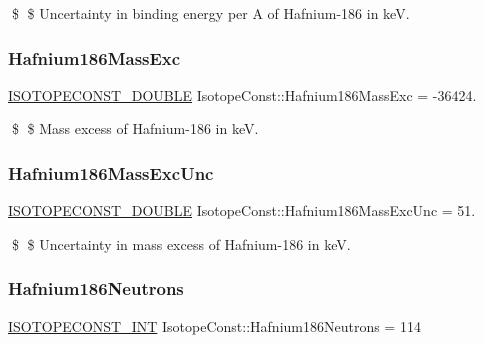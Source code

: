 \$ \$ Uncertainty in binding energy per A of Hafnium-\/186 in keV. \mbox{\label{group___isotope_const-_hafnium-_hf186_ga4c99e82df86530412f126ce981fc8a4b}} 
\subsubsection{\texorpdfstring{Hafnium186\+Mass\+Exc}{Hafnium186MassExc}}
{\footnotesize\ttfamily \mbox{\hyperlink{group___isotope_const-_macros_ga8f45a7272ce02c0b4c65c44636ed719a}{I\+S\+O\+T\+O\+P\+E\+C\+O\+N\+S\+T\+\_\+\+D\+O\+U\+B\+LE}} Isotope\+Const\+::\+Hafnium186\+Mass\+Exc = -\/36424.}

\$ \$ Mass excess of Hafnium-\/186 in keV. \mbox{\label{group___isotope_const-_hafnium-_hf186_gac3b5f85fcc136638dfdcbd44229a33a6}} 
\subsubsection{\texorpdfstring{Hafnium186\+Mass\+Exc\+Unc}{Hafnium186MassExcUnc}}
{\footnotesize\ttfamily \mbox{\hyperlink{group___isotope_const-_macros_ga8f45a7272ce02c0b4c65c44636ed719a}{I\+S\+O\+T\+O\+P\+E\+C\+O\+N\+S\+T\+\_\+\+D\+O\+U\+B\+LE}} Isotope\+Const\+::\+Hafnium186\+Mass\+Exc\+Unc = 51.}

\$ \$ Uncertainty in mass excess of Hafnium-\/186 in keV. \mbox{\label{group___isotope_const-_hafnium-_hf186_ga08de4b3f95809b67fc9a35058d02888a}} 
\subsubsection{\texorpdfstring{Hafnium186\+Neutrons}{Hafnium186Neutrons}}
{\footnotesize\ttfamily \mbox{\hyperlink{group___isotope_const-_macros_ga5f18360b3e99483a35c32d789e62621c}{I\+S\+O\+T\+O\+P\+E\+C\+O\+N\+S\+T\+\_\+\+I\+NT}} Isotope\+Const\+::\+Hafnium186\+Neutrons = 114}

